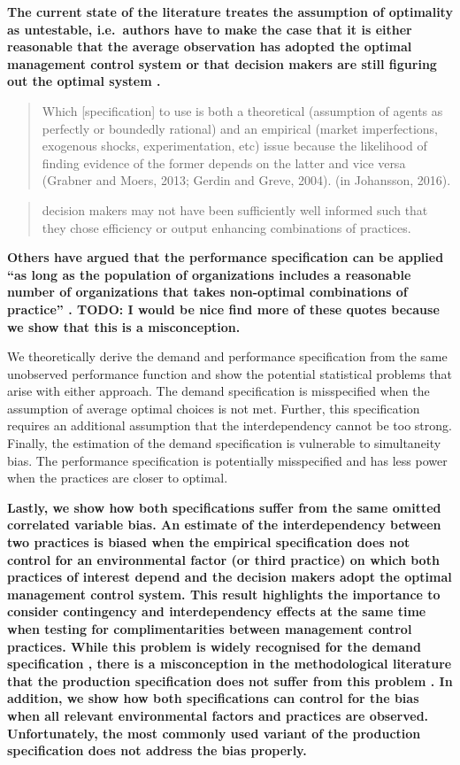 \documentclass[12pt]{article}
\begin{document}
\textbf{The current state of the literature treates the assumption of
optimality as untestable, i.e.~authors have to make the case that it is
either reasonable that the average observation has adopted the optimal
management control system or that decision makers are still figuring out
the optimal system \citep{Grabner2013}.}

\begin{quote}
Which {[}specification{]} to use is both a theoretical (assumption of
agents as perfectly or boundedly rational) and an empirical (market
imperfections, exogenous shocks, experimentation, etc) issue because the
likelihood of finding evidence of the former depends on the latter and
vice versa (Grabner and Moers, 2013; Gerdin and Greve, 2004). (in
Johansson, 2016).
\end{quote}

\begin{quote}
decision makers may not have been sufficiently well informed such that
they chose efficiency or output enhancing combinations of practices.
\citep{Carree2011}
\end{quote}

\textbf{Others have argued that the performance specification can be
applied ``as long as the population of organizations includes a
reasonable number of organizations that takes non-optimal combinations
of practice'' \citep{Carree2011}. TODO: I would be nice find more of
these quotes because we show that this is a misconception.}

We theoretically derive the demand and performance specification from
the same unobserved performance function and show the potential
statistical problems that arise with either approach. The demand
specification is misspecified when the assumption of average optimal
choices is not met. Further, this specification requires an additional
assumption that the interdependency cannot be too strong. Finally, the
estimation of the demand specification is vulnerable to simultaneity
bias. The performance specification is potentially misspecified and has
less power when the practices are closer to optimal.

\textbf{Lastly, we show how both specifications suffer from the same
omitted correlated variable bias. An estimate of the interdependency
between two practices is biased when the empirical specification does
not control for an environmental factor (or third practice) on which
both practices of interest depend and the decision makers adopt the
optimal management control system. This result highlights the importance
to consider contingency and interdependency effects at the same time
when testing for complimentarities between management control practices.
While this problem is widely recognised for the demand specification
\citep[\citet{Grabner2013}]{Arora1996}, there is a misconception in the
methodological literature that the production specification does not
suffer from this problem \citep{Carree2011}. In addition, we show how
both specifications can control for the bias when all relevant
environmental factors and practices are observed. Unfortunately, the
most commonly used variant of the production specification does not
address the bias properly.}
\end{document}
